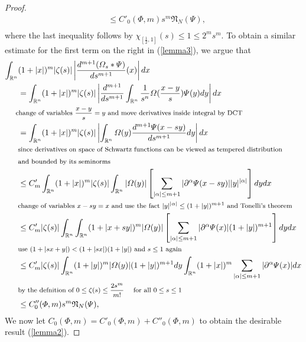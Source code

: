 \documentclass[12pt]{article}  %
\numberwithin{equation}{subsection}
\theoremstyle{plain}
\begin{document}
\begin{proof}
\begin{align*}
	&\le C'_0(\varPhi,m)s^m \mathfrak{N}_N(\varPsi), \\
	\end{align*}
	where the last inequality follows by $\chi_{[\frac{1}{2},1]}(s)\le 1\le 2^ms^m$. To obtain a similar estimate for the first term on the right in (\ref{lemma3}), we argue that
	\begin{align*}
		\int_{\mathbb{R}^n}&(1+|x|)^m|\zeta(s)|\left| \frac{d^{m+1}(\varOmega_s*\varPsi)}{ds^{m+1}}(x) \right| dx \\
		&= \int_{\mathbb{R}^n}(1+|x|)^m|\zeta(s)|\left| \frac{d^{m+1}}{ds^{m+1}}  \int_{\mathbb{R}^n}\frac{1}{s^n}\varOmega(\frac{x-y}{s})\varPsi(y) dy\right| dx \\
		\text{\footnotesize\rlap{change of variables $\frac{x-y}{s} = y$ and move derivatives inside integral by DCT} }\\
		&= \int_{\mathbb{R}^n}(1+|x|)^m|\zeta(s)|\left| \int_{\mathbb{R}^n}\varOmega(y)\frac{d^{m+1}\varPsi(x-sy)}{ds^{m+1}}dy\right| dx\\
		\text{\footnotesize\rlap{since derivatives on space of Schwartz functions can be viewed as tempered distribution }}\\
		\text{\footnotesize\rlap{and bounded by its seminorms}}\\
		&\le C'_m \int_{\mathbb{R}^n}(1+|x|)^m|\zeta(s)| \int_{\mathbb{R}^n} |\varOmega(y)| \left[ \sum_{|\alpha|\le m+1}|\partial^\alpha\varPsi(x-sy)||y|^{|\alpha|} \right] dydx \\	
		\text{\footnotesize\rlap{change of variables $x-sy = x$ and use the fact $|y|^{|\alpha|}\le (1+|y|)^{m+1}$ and Tonelli's theorem}}\\
		&\le C'_m|\zeta(s)|\int_{\mathbb{R}^n}\int_{\mathbb{R}^n}(1+|x+sy|)^m |\varOmega(y)|\left[ \sum_{|\alpha|\le m+1}|\partial^\alpha\varPsi(x)|(1+|y|)^{m+1} \right] dydx \\
		\text{\footnotesize\rlap{use $(1+|sx+y|)<(1+|sx|)(1+|y|)$ and $s\le 1$ again}}\\
		&\le C'_m|\zeta(s)|\int_{\mathbb{R}^n}(1+|y|)^m|\varOmega(y)|(1+|y|)^{m+1}dy \int_{\mathbb{R}^n}(1+|x|)^m\sum_{|\alpha|\le m+1}|\partial^\alpha\varPsi(x)|dx\\
		\text{\footnotesize\rlap{by the defnition of $0\le \zeta(s) \le \frac{2s^m}{m!} \quad$ for all  $0\le s \le 1$}}\\
		&\le C''_0(\varPhi,m)s^m \mathfrak{N}_N(\varPsi), \\
	\end{align*}
	We now let $C_0(\varPhi,m) =  C'_0(\varPhi,m) + C''_0(\varPhi,m)$ to obtain the desirable result (\ref{lemma2}).
\end{proof}
\end{document}
